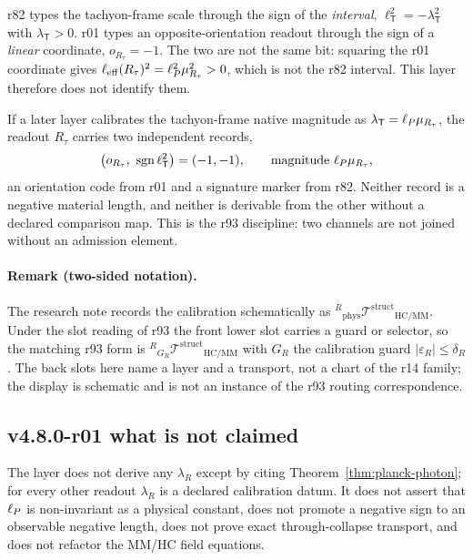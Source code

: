 r82 types the tachyon-frame scale through the sign of the \emph{interval},
\(\ell_{\mathsf T}^2=-\lambda_{\mathsf T}^2\) with \(\lambda_{\mathsf T}>0\).  r01 types an
opposite-orientation readout through the sign of a \emph{linear} coordinate,
\(o_{R_\tau}=-1\).  The two are not the same bit: squaring the r01 coordinate gives
\(\ell_{\rm eff}(R_\tau)^2=\ell_P^2\mu_{R_\tau}^2>0\), which is not the r82 interval.  This layer
therefore does not identify them.

If a later layer calibrates the tachyon-frame native magnitude as
\(\lambda_{\mathsf T}=\ell_P\mu_{R_\tau}\), the readout \(R_\tau\) carries two independent records,
\[
\bigl(o_{R_\tau},\ \operatorname{sgn}\ell_{\mathsf T}^2\bigr)=(-1,-1),
\qquad
\text{magnitude } \lP\mu_{R_\tau},
\]
an orientation code from r01 and a signature marker from r82.  Neither record is a negative
material length, and neither is derivable from the other without a declared comparison map.
This is the r93 discipline: two channels are not joined without an admission element.

\paragraph{Remark (two-sided notation).}
The research note records the calibration schematically as
\({}^{R}{}_{\mathrm{phys}}\mathcal T^{\mathrm{struct}}{}_{\mathrm{HC/MM}}\).  Under the slot
reading of r93 the front lower slot carries a guard or selector, so the matching r93 form is
\({}^{R}{}_{G_R}\mathcal T^{\mathrm{struct}}{}_{\mathrm{HC/MM}}\) with \(G_R\) the calibration
guard \(|\varepsilon_R|\le\delta_R\).  The back slots here name a layer and a transport, not a
chart of the r14 family; the display is schematic and is not an instance of the r93 routing
correspondence.

\subsection*{v4.8.0-r01 what is not claimed}
\label{subsec:v480-r01-not-claimed}

The layer does not derive any \(\lambda_R\) except by citing
Theorem~\ref{thm:planck-photon}; for every other readout \(\lambda_R\) is a declared
calibration datum.  It does not assert that \(\ell_P\) is non-invariant as a physical constant,
does not promote a negative sign to an observable negative length, does not prove exact
through-collapse transport, and does not refactor the MM/HC field equations.


